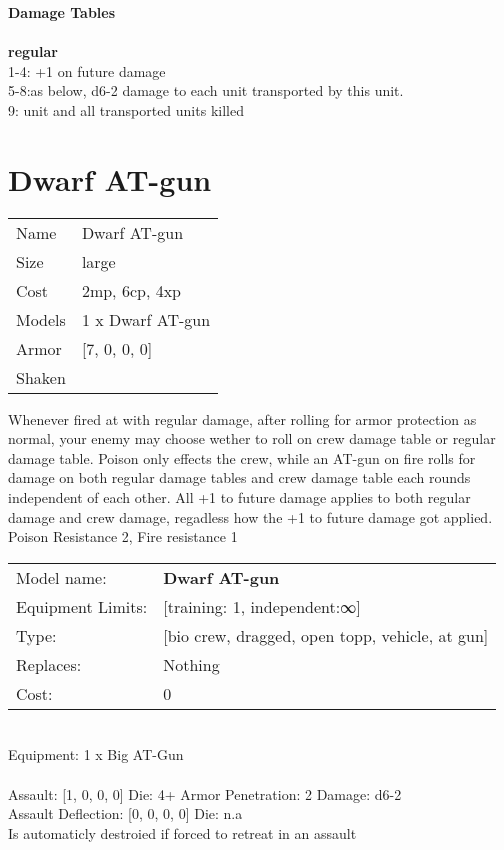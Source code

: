 {\bf Damage Tables} \\
\ \\ {\bf regular } \\
1-4: +1 on future damage \\
5-8:as below, d6-2 damage to each unit transported by this unit. \\
9: unit and all transported units killed \\










\pagebreak\pagebreak

\section{ Dwarf AT-gun }

\begin{tabular}{ll}
  Name & Dwarf AT-gun \\
  Size & large\\
  Cost & 2mp, 6cp, 4xp\\
  Models & 1 x Dwarf AT-gun\\
  Armor & [7, 0, 0, 0]\\
  Shaken & \\
\end{tabular}

\noindent Whenever fired at with regular damage, after rolling for armor protection as normal, your enemy may choose wether to roll on crew damage table or regular damage table. Poison only effects the crew, while an AT-gun on fire rolls for damage on both regular damage tables and crew damage table each rounds independent of each other. All +1 to future damage applies to both regular damage and crew damage, regadless how the +1 to future damage got applied.\\ 
 Poison Resistance 2, Fire resistance 1\\ 


\noindent
\begin{tabular}{ll}
Model name: &{\bf Dwarf AT-gun } \\
Equipment Limits: &[training: 1, independent:∞] \\
Type: &[bio crew, dragged, open topp, vehicle, at gun] \\
Replaces: &Nothing \\
Cost: & 0\\
\end{tabular}
\ \\
Equipment: 1 x Big AT-Gun \\
\ \\
Assault: [1, 0, 0, 0] Die: 4+ Armor Penetration: 2 Damage: d6-2 \\
Assault Deflection: [0, 0, 0, 0] Die: n.a\\
\indent Is automaticly destroied if forced to retreat in an assault\\ 
 

